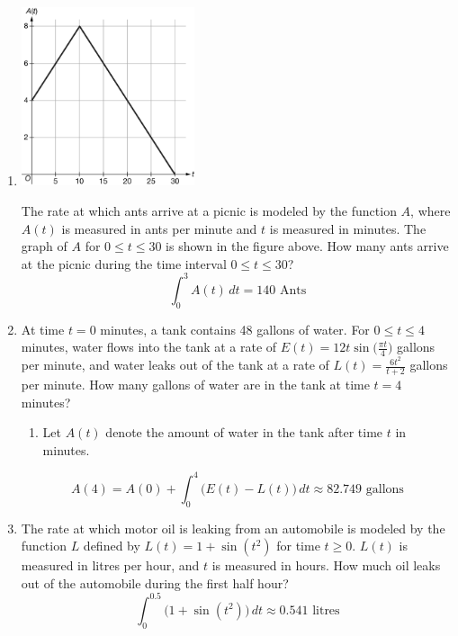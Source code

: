 \documentclass[12pt]{article}
\begin{document}
\begin{enumerate}
\begin{enumerate}
    \item 
    \begin{center}
        \includegraphics[width=2in]{4.052.png}
    \end{center}
    The rate at which ants arrive at a picnic is modeled by the function $A$, where $A(t)$ is measured in ants per minute and $t$ is measured in minutes. The graph of $A$ for $0 \leq t \leq 30$ is shown in the figure above. How many ants arrive at the picnic during the time interval $0 \leq t \leq 30$?
    $$\int_{0}^{3} A(t) \, dt = \boxed{140 \text{ Ants}}$$

    \item At time $t = 0$ minutes, a tank contains 48 gallons of water. For $0 \leq t \leq 4$ minutes, water flows into the tank at a rate of $E(t)=12t\sin\big(\frac{\pi t}{4}\big)$ gallons per minute, and water leaks out of the tank at a rate of $L(t)=\frac{6t^2}{t+2}$ gallons per minute. How many gallons of water are in the tank at time $t = 4$ minutes?
    \begin{enumerate}
        \item Let $A(t)$ denote the amount of water in the tank after time $t$ in minutes.
    \end{enumerate}
    $$A(4)=A(0) + \int_{0}^{4} \bigg(E(t)-L(t)\bigg) \, dt \approx \boxed{82.749 \text{ gallons}}$$

    \item The rate at which motor oil is leaking from an automobile is modeled by the function $L$ defined by $L(t) = 1 + \sin(t^2)$ for time $t \geq 0$. $L(t)$ is measured in litres per hour, and $t$ is measured in hours. How much oil leaks out of the automobile during the first half hour?
    $$\int_{0}^{0.5} \bigg(1+\sin(t^2)\bigg) \, dt \approx \boxed{0.541 \text{ litres}}$$


\end{enumerate}
\end{enumerate}
\end{document}
